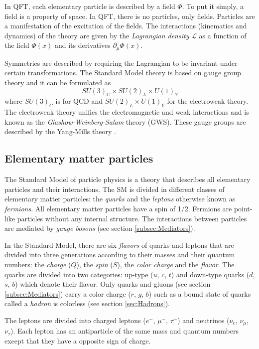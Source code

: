 In QFT, each elementary particle is described by a field $\Phi$. To put it simply, a field is a property of space. In QFT, there is no particles, only fields. Particles are a manifestation of the excitation of the fields. The interactions (kinematics and dynamics) of the theory are given by the \textit{Lagrangian density} $\mathcal{L}$ as a function of the field $\Phi(x)$ and its derivatives $\partial_{\mu}\Phi(x)$.

Symmetries are described by requiring the Lagrangian to be invariant under certain transformations. The Standard Model theory is based on gauge group theory and it can be formulated as
\begin{equation}
  SU(3)_{C} \times SU(2)_{L} \times U(1)_{Y}
\end{equation}
where $SU(3)_{C}$ is for QCD and $SU(2)_{L} \times U(1)_{Y}$ for the electroweak theory. The electroweak theory unifies the electromagnetic and weak interactions and is known as the \textit{Glashow-Weinberg-Salam} theory (GWS). These gauge groups are described by the Yang-Mills theory \cite{Yang:1954ek}.

\subsection{Elementary matter particles}

The Standard Model of particle physics is a theory that describes all elementary particles and their interactions. The SM is divided in different classes of elementary matter particles: the \textit{quarks} and the \textit{leptons} otherwise known as \textit{fermions}. All elementary matter particles have a spin of 1/2. Fermions are point-like particles without any internal structure. The interactions between particles are mediated by \textit{gauge bosons} (see section \ref{subsec:Mediators}).

In the Standard Model, there are six \textit{flavors} of quarks and leptons that are divided into three generations according to their masses and their quantum numbers: the \textit{charge} ($Q$), the \textit{spin} ($S$), the \textit{color charge} and the \textit{flavor}. The quarks are divided into two categories: up-type ($u$, $c$, $t$) and down-type quarks ($d$, $s$, $b$) which denote their flavor. Only quarks and gluons (see section \ref{subsec:Mediators}) carry a color charge ($r$, $g$, $b$) such as a bound state of quarks called a \textit{hadron} is colorless (see section \ref{sec:Hadrons}).

The leptons are divided into charged leptons ($e^-$, $\mu^-$, $\tau^-$) and neutrinos ($\nu_e$, $\nu_{\mu}$, $\nu_{\tau}$). Each lepton has an antiparticle of the same mass and quantum numbers except that they have a opposite sign of charge.

